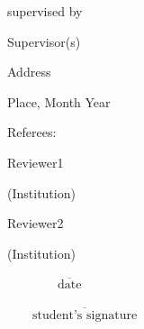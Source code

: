 \begin{titlepage}
\normalsize supervised by
\vfill%

\Large	Supervisor(s) %
	\vfill%


\normalsize Address \vfill%

\large Place, Month Year

\vfill
Referees:

\Large Reviewer1

\normalsize (Institution)


\Large Reviewer2

\normalsize (Institution)
\vspace{2.5cm}

\begin{minipage}{0.4\textwidth}
\begin{flushleft}
$\overline{\qquad\qquad \text{date} \qquad\qquad}$
\end{flushleft}
\end{minipage}%
\begin{minipage}{0.4\textwidth}
\begin{flushright}
$\overline{\qquad \text{student's signature} \qquad}$
\end{flushright}
\end{minipage}
\clearpage{\pagestyle{empty}\cleardoublepage}
\end{titlepage}

\flushbottom